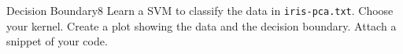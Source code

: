 \begin{questions}

\begin{question}{Decision Boundary}{8}
Learn a SVM to classify the data in \texttt{iris-pca.txt}. Choose your kernel. Create a plot showing the data and the decision boundary. Attach a snippet of your code.

\begin{answer}\end{answer}

\end{question}

\end{questions}
